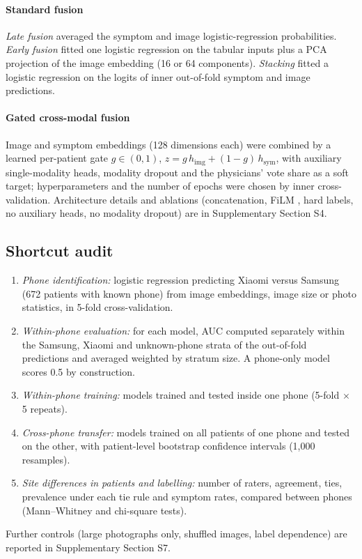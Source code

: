 \documentclass[preprint,12pt]{elsarticle}
\begin{document}
\paragraph{Standard fusion} \textit{Late fusion} averaged the symptom and image logistic-regression probabilities. \textit{Early fusion} fitted one logistic regression on the tabular inputs plus a PCA projection of the image embedding (16 or 64 components). \textit{Stacking} fitted a logistic regression on the logits of inner out-of-fold symptom and image predictions.

\paragraph{Gated cross-modal fusion} Image and symptom embeddings (128 dimensions each) were combined by a learned per-patient gate $g \in (0, 1)$, $z = g\, h_{\text{img}} + (1-g)\, h_{\text{sym}}$, with auxiliary single-modality heads, modality dropout and the physicians' vote share as a soft target; hyperparameters and the number of epochs were chosen by inner cross-validation. Architecture details and ablations (concatenation, FiLM \cite{perez2018film}, hard labels, no auxiliary heads, no modality dropout) are in Supplementary Section S4.

\subsection{Shortcut audit}
\label{sec:shortcut-methods}

\begin{enumerate}
\item \textit{Phone identification:} logistic regression predicting Xiaomi versus Samsung (672 patients with known phone) from image embeddings, image size or photo statistics, in 5-fold cross-validation.
\item \textit{Within-phone evaluation:} for each model, AUC computed separately within the Samsung, Xiaomi and unknown-phone strata of the out-of-fold predictions and averaged weighted by stratum size. A phone-only model scores 0.5 by construction.
\item \textit{Within-phone training:} models trained and tested inside one phone (5-fold $\times$ 5 repeats).
\item \textit{Cross-phone transfer:} models trained on all patients of one phone and tested on the other, with patient-level bootstrap confidence intervals (1,000 resamples).
\item \textit{Site differences in patients and labelling:} number of raters, agreement, ties, prevalence under each tie rule and symptom rates, compared between phones (Mann--Whitney and chi-square tests).
\end{enumerate}
Further controls (large photographs only, shuffled images, label dependence) are reported in Supplementary Section S7.
\end{document}
